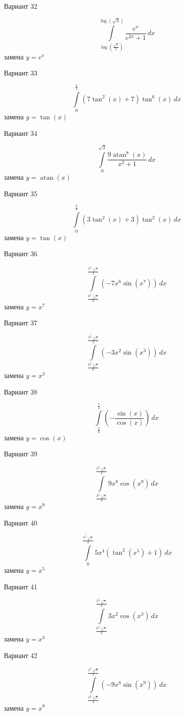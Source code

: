 \documentclass[11pt]{report}
\begin{document}
Вариант 32

$$\int\limits_{\log{\left(\frac{\sqrt{3}}{3} \right)}}^{\log{\left(\sqrt{3} \right)}} \frac{e^{x}}{e^{2 x} + 1}\, dx$$
замена $y = e^{x}$

Вариант 33

$$\int\limits_{0}^{\frac{\pi}{3}} \left(7 \tan^{2}{\left(x \right)} + 7\right) \tan^{6}{\left(x \right)}\, dx$$
замена $y = \tan{\left(x \right)}$

Вариант 34

$$\int\limits_{0}^{\sqrt{3}} \frac{9 \operatorname{atan}^{8}{\left(x \right)}}{x^{2} + 1}\, dx$$
замена $y = \operatorname{atan}{\left(x \right)}$

Вариант 35

$$\int\limits_{0}^{\frac{\pi}{3}} \left(3 \tan^{2}{\left(x \right)} + 3\right) \tan^{2}{\left(x \right)}\, dx$$
замена $y = \tan{\left(x \right)}$

Вариант 36

$$\int\limits_{\frac{6^{\frac{6}{7}} \sqrt[7]{\pi}}{6}}^{\frac{2^{\frac{5}{7}} \sqrt[7]{\pi}}{2}} \left(- 7 x^{6} \sin{\left(x^{7} \right)}\right)\, dx$$
замена $y = x^{7}$

Вариант 37

$$\int\limits_{\frac{6^{\frac{2}{3}} \sqrt[3]{\pi}}{6}}^{\frac{3^{\frac{2}{3}} \sqrt[3]{\pi}}{3}} \left(- 3 x^{2} \sin{\left(x^{3} \right)}\right)\, dx$$
замена $y = x^{3}$

Вариант 38

$$\int\limits_{\frac{\pi}{6}}^{\frac{\pi}{4}} \left(- \frac{\sin{\left(x \right)}}{\cos{\left(x \right)}}\right)\, dx$$
замена $y = \cos{\left(x \right)}$

Вариант 39

$$\int\limits_{\frac{3^{\frac{8}{9}} \sqrt[9]{\pi}}{3}}^{\frac{2^{\frac{8}{9}} \sqrt[9]{\pi}}{2}} 9 x^{8} \cos{\left(x^{9} \right)}\, dx$$
замена $y = x^{9}$

Вариант 40

$$\int\limits_{0}^{\frac{3^{\frac{4}{5}} \sqrt[5]{\pi}}{3}} 5 x^{4} \left(\tan^{2}{\left(x^{5} \right)} + 1\right)\, dx$$
замена $y = x^{5}$

Вариант 41

$$\int\limits_{\frac{6^{\frac{2}{3}} \sqrt[3]{\pi}}{6}}^{\frac{3^{\frac{2}{3}} \sqrt[3]{\pi}}{3}} 3 x^{2} \cos{\left(x^{3} \right)}\, dx$$
замена $y = x^{3}$

Вариант 42

$$\int\limits_{\frac{3^{\frac{8}{9}} \sqrt[9]{\pi}}{3}}^{\frac{2^{\frac{8}{9}} \sqrt[9]{\pi}}{2}} \left(- 9 x^{8} \sin{\left(x^{9} \right)}\right)\, dx$$
замена $y = x^{9}$
\end{document}
